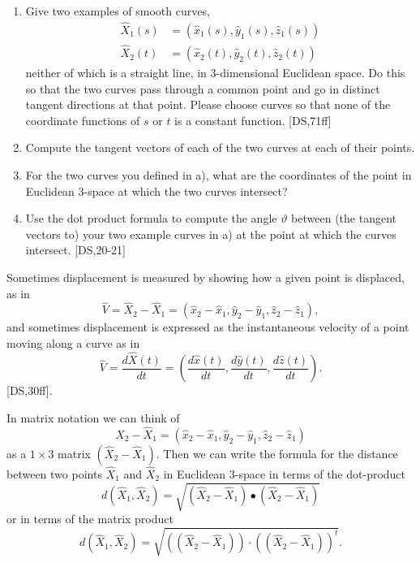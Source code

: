 \begin{exercise}\hfil
\begin{enumerate}
\label{1}\item Give two examples of smooth curves,
\begin{align*}
\hat{X}_{1}\left(  s\right)   &  =\left(  \hat{x}_{1}\left(  s\right)
,\hat{y}_{1}\left(  s\right)  ,\hat{z}_{1}\left(  s\right)  \right) \\
\hat{X}_{2}\left(  t\right)   &  =\left(  \hat{x}_{2}\left(  t\right)
,\hat{y}_{2}\left(  t\right)  ,\hat{z}_{2}\left(  t\right)  \right)
\end{align*}
neither of which is a straight line, in $3$-dimensional Euclidean space. Do
this so that the two curves pass through a common point and go in distinct
tangent directions at that point. Please choose curves so that none of the
coordinate functions of $s$ or $t$ is a constant function. [DS,71ff]

\item Compute the tangent vectors of each of the two curves at each of their points.

\item For the two curves you defined in a), what are the coordinates of the point
in Euclidean $3$-space at which the two curves intersect?

\item Use the dot product formula to compute the angle $\vartheta$ between (the
tangent vectors to) your two example curves in a) at the point at which the
curves intersect. [DS,20-21]
\end{enumerate}
\end{exercise}

Sometimes displacement is measured by showing how a given point is displaced,
as in%
\[
\hat{V}=\hat{X}_{2}-\hat{X}_{1}=\left(  \hat{x}_{2}-\hat{x}_{1},\hat{y}%
_{2}-\hat{y}_{1},\hat{z}_{2}-\hat{z}_{1}\right)  ,
\]
and sometimes displacement is expressed as the instantaneous velocity of a
point moving along a curve as in%
\[
\hat{V}=\frac{d\hat{X}\left(  t\right)  }{dt}=\left(  \frac{d\hat{x}\left(
t\right)  }{dt},\frac{d\hat{y}\left(  t\right)  }{dt},\frac{d\hat{z}\left(
t\right)  }{dt}\right)  .
\]
[DS,30ff].

In matrix notation we can think of
\[
\hat{X}_{2}-\hat{X}_{1}=\left(  \hat{x}_{2}-\hat{x}_{1},\hat{y}_{2}-\hat
{y}_{1},\hat{z}_{2}-\hat{z}_{1}\right)
\]
as a $1\times3$ matrix $\left(  \hat{X}_{2}-\hat{X}_{1}\right)  $. Then we can
write the formula for the distance between two points $\hat{X}_{1}$ and
$\hat{X}_{2}$ in Euclidean $3$-space in terms of the dot-product%
\begin{equation}
d\left(  \hat{X}_{1},\hat{X}_{2}\right)  =\sqrt{\left(  \hat{X}_{2}-\hat
{X}_{1}\right)  \bullet\left(  \hat{X}_{2}-\hat{X}_{1}\right)  } \label{13}%
\end{equation}
or in terms of the matrix product%
\[
d\left(  \hat{X}_{1},\hat{X}_{2}\right)  =\sqrt{\left(  \left(  \hat{X}%
_{2}-\hat{X}_{1}\right)  \right)  \cdot\left(  \left(  \hat{X}_{2}-\hat{X}%
_{1}\right)  \right)  ^{t}}.
\]


